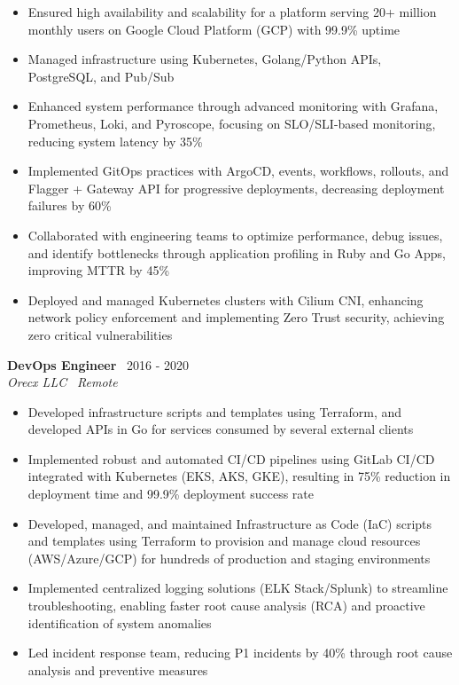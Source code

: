\documentclass[11pt,a4paper]{article}
\newcommand{\resumeSubheading}[4]{
  \vspace{2pt}
  \textbf{#1} \hfill #2 \\
  \textit{#3} \hfill \textit{#4}
  \vspace{2pt}
}
\begin{document}
\begin{itemize}[leftmargin=*, itemsep=1pt, parsep=0pt, topsep=2pt]
    \item Ensured high availability and scalability for a platform serving 20+ million monthly users on Google Cloud Platform (GCP) with 99.9\% uptime
    \item Managed infrastructure using Kubernetes, Golang/Python APIs, PostgreSQL, and Pub/Sub
    \item Enhanced system performance through advanced monitoring with Grafana, Prometheus, Loki, and Pyroscope, focusing on SLO/SLI-based monitoring, reducing system latency by 35\%
    \item Implemented GitOps practices with ArgoCD, events, workflows, rollouts, and Flagger + Gateway API for progressive deployments, decreasing deployment failures by 60\%
    \item Collaborated with engineering teams to optimize performance, debug issues, and identify bottlenecks through application profiling in Ruby and Go Apps, improving MTTR by 45\%
    \item Deployed and managed Kubernetes clusters with Cilium CNI, enhancing network policy enforcement and implementing Zero Trust security, achieving zero critical vulnerabilities
\end{itemize}

\resumeSubheading
{DevOps Engineer}{\faCalendar\ 2016 - 2020}
{Orecx LLC}{\faMapMarker\ Remote}

\begin{itemize}[leftmargin=*, itemsep=1pt, parsep=0pt, topsep=2pt]
    \item Developed infrastructure scripts and templates using Terraform, and developed APIs in Go for services consumed by several external clients
    \item Implemented robust and automated CI/CD pipelines using GitLab CI/CD integrated with Kubernetes (EKS, AKS, GKE), resulting in 75\% reduction in deployment time and 99.9\% deployment success rate
    \item Developed, managed, and maintained Infrastructure as Code (IaC) scripts and templates using Terraform to provision and manage cloud resources (AWS/Azure/GCP) for hundreds of production and staging environments
    \item Implemented centralized logging solutions (ELK Stack/Splunk) to streamline troubleshooting, enabling faster root cause analysis (RCA) and proactive identification of system anomalies
    \item Led incident response team, reducing P1 incidents by 40\% through root cause analysis and preventive measures
\end{itemize}
\end{document}
